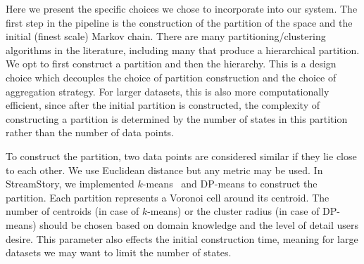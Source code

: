Here we present the specific choices we chose to incorporate into our system.  
%
%
The first step in the pipeline is the construction of the partition of the space and the initial (finest scale) Markov chain.
There are many partitioning/clustering algorithms in the literature, including many that produce a hierarchical partition. %
We opt to first construct a partition and then the hierarchy. This is a design choice which decouples the choice of partition construction and the choice of aggregation strategy.  For larger datasets, this is also more computationally efficient, since after the initial partition is constructed, the complexity of constructing a partition is determined by the number of states in this partition rather than the number of data points.  	


To construct the partition, two data points are considered similar if they lie close
to each other. We use Euclidean distance but any metric may be used.
%
In StreamStory, we implemented $k$-means~\cite{Maimon:2005:DMK:1088958} and DP-means \cite{DBLP:journals/corr/abs-1111-0352} to construct the partition. Each  
partition  represents a  Voronoi cell around its centroid. 
%
%
The number of centroids (in case of $k$-means) or the cluster radius (in case of DP-means) should
be chosen based on domain knowledge and the level of detail users desire. This parameter also effects the 
initial construction time, meaning for large datasets we may want to limit the number of states.


